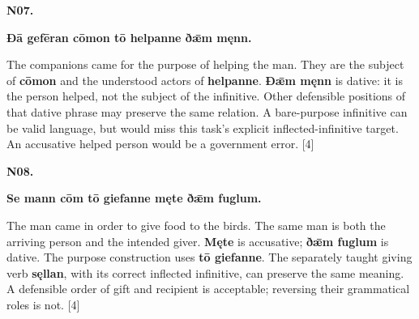 \par\begin{minipage}{\linewidth}\raggedright
\textbf{N07.}

\textbf{Ðā gefēran cōmon tō helpanne ðǣm męnn.}

The companions came for the purpose of helping the man. They are the subject of \textbf{cōmon} and the understood actors of \textbf{helpanne}. \textbf{Ðǣm męnn} is dative: it is the person helped, not the subject of the infinitive. Other defensible positions of that dative phrase may preserve the same relation. A bare-purpose infinitive can be valid language, but would miss this task’s explicit inflected-infinitive target. An accusative helped person would be a government error. [4]

\end{minipage}\par\addvspace{4pt}

\par\begin{minipage}{\linewidth}\raggedright
\textbf{N08.}

\textbf{Se mann cōm tō giefanne męte ðǣm fuglum.}

The man came in order to give food to the birds. The same man is both the arriving person and the intended giver. \textbf{Męte} is accusative; \textbf{ðǣm fuglum} is dative. The purpose construction uses \textbf{tō giefanne}. The separately taught giving verb \textbf{sęllan}, with its correct inflected infinitive, can preserve the same meaning. A defensible order of gift and recipient is acceptable; reversing their grammatical roles is not. [4]

\end{minipage}\par\addvspace{4pt}

